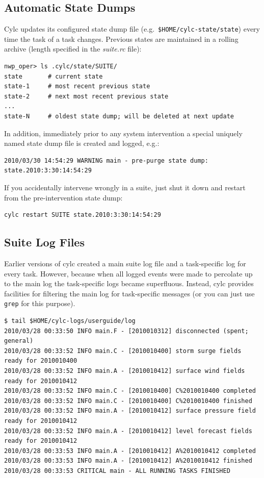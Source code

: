 \documentclass[11pt,a4paper]{article}
\begin{document}
\subsection{Automatic State Dumps}
\label{AutomaticStateDumps}

Cylc updates its configured state dump file (e.g.\
\lstinline=$HOME/cylc-state/state=) every time the task of a task
changes. Previous states are maintained in a rolling archive 
(length specified in the {\em suite.rc} file):

\begin{lstlisting}
nwp_oper> ls .cylc/state/SUITE/
state       # current state
state-1     # most recent previous state
state-2     # next most recent previous state
...
state-N     # oldest state dump; will be deleted at next update
\end{lstlisting}

In addition, immediately prior to any system intervention a special
uniquely named state dump file is created and logged, e.g.:

\begin{lstlisting}
2010/03/30 14:54:29 WARNING main - pre-purge state dump: state.2010:3:30:14:54:29
\end{lstlisting}

If you accidentally intervene wrongly in a suite, just shut it down
and restart from the pre-intervention state dump:

\begin{lstlisting}
cylc restart SUITE state.2010:3:30:14:54:29
\end{lstlisting}

\subsection{Suite Log Files}
\label{SuiteLogFiles}

Earlier versions of cylc created a main suite log file and a
task-specific log for every task. However, because when all logged
events were made to percolate up to the main log the task-specific logs
became superfluous. Instead, cylc provides facilities for filtering the
main log for task-specific messages (or you can just use
\lstinline=grep= for this purpose).

\begin{lstlisting}
$ tail $HOME/cylc-logs/userguide/log
2010/03/28 00:33:50 INFO main.F - [2010010312] disconnected (spent; general)
2010/03/28 00:33:52 INFO main.C - [2010010400] storm surge fields ready for 2010010400
2010/03/28 00:33:52 INFO main.A - [2010010412] surface wind fields ready for 2010010412
2010/03/28 00:33:52 INFO main.C - [2010010400] C%2010010400 completed
2010/03/28 00:33:52 INFO main.C - [2010010400] C%2010010400 finished
2010/03/28 00:33:52 INFO main.A - [2010010412] surface pressure field ready for 2010010412
2010/03/28 00:33:52 INFO main.A - [2010010412] level forecast fields ready for 2010010412
2010/03/28 00:33:53 INFO main.A - [2010010412] A%2010010412 completed
2010/03/28 00:33:53 INFO main.A - [2010010412] A%2010010412 finished
2010/03/28 00:33:53 CRITICAL main - ALL RUNNING TASKS FINISHED
\end{lstlisting}
\end{document}
